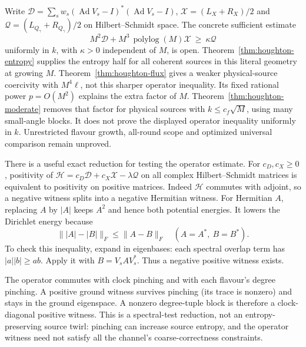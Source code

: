 Write $\mathcal D=\sum_sw_s(\operatorname{Ad}V_s-I)^*
(\operatorname{Ad}V_s-I)$,
$\mathcal X=(L_X+R_X)/2$ and
$\mathcal Q=(L_{Q_\gamma}+R_{Q_\gamma})/2$ on Hilbert--Schmidt space.
The concrete sufficient estimate
\begin{equation}\label{eq:open-killed-laplacian}
 M^2\mathcal D+M^3\,\operatorname{polylog}(M)\mathcal X
       \ \geq\ \kappa\mathcal Q
\end{equation}
uniformly in $k$, with $\kappa>0$ independent of $M$, is open.
Theorem~\ref{thm:houghton-entropy} supplies the entropy half for all
coherent sources in this literal geometry at growing $M$.
Theorem~\ref{thm:houghton-flux} gives a weaker physical-source
coercivity with $M^4\ell$, not this sharper operator inequality.
Its fixed rational power $p=O(M^2)$ explains the extra factor of $M$.
Theorem~\ref{thm:houghton-moderate} removes that factor for physical
sources with $k\leq c_f\sqrt M$, using many small-angle blocks.
It does not prove the displayed operator inequality uniformly in $k$.
Unrestricted flavour growth, all-round scope and optimized universal
comparison remain unproved.

There is a useful exact reduction for testing the operator estimate.
For $c_D,c_X\geq0$, positivity of
$\mathcal H=c_D\mathcal D+c_X\mathcal X-\lambda\mathcal Q$
on all complex Hilbert--Schmidt matrices is equivalent to positivity
on positive matrices. Indeed $\mathcal H$ commutes with adjoint,
so a negative witness splits into a negative Hermitian witness.
For Hermitian $A$, replacing $A$ by $|A|$ keeps $A^2$ and hence
both potential energies. It lowers the Dirichlet energy because
\[
 \||A|-|B|\|_F\leq\|A-B\|_F\quad(A=A^*,\ B=B^*).
\]
To check this inequality, expand in eigenbases: each spectral
overlap term has $|a||b|\geq ab$. Apply it with
$B=V_sAV_s^*$. Thus a negative positive witness exists.

The operator commutes with clock pinching and with each flavour's
degree pinching. A positive ground witness survives pinching
(its trace is nonzero) and stays in the ground eigenspace.
A nonzero degree-tuple block is therefore a clock-diagonal
positive witness. This is a spectral-test reduction, not an
entropy-preserving source twirl: pinching can increase source
entropy, and the operator witness need not satisfy all the
channel's coarse-correctness constraints.
